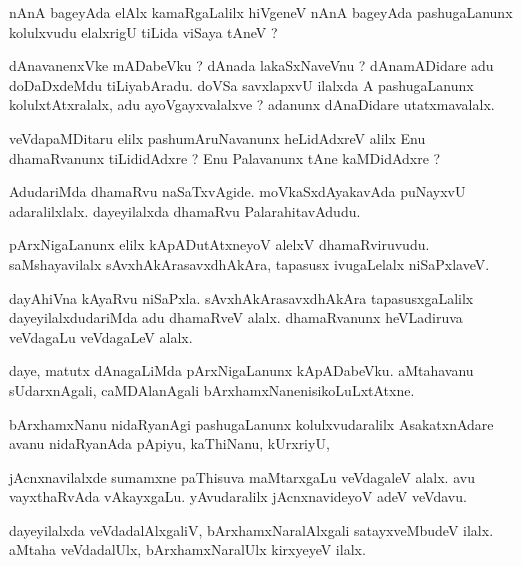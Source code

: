 \documentclass{article}
\begin{document}
\begin{mn}
nAnA bageyAda elAlx kamaRgaLalilx hiVgeneV nAnA bageyAda pashugaLanunx kolulxvudu elalxrigU tiLida viSaya tAneV ?
\end{mn}

\begin{mn}
dAnavanenxVke mADabeVku ? dAnada lakaSxNaveVnu ?  dAnamADidare adu doDaDxdeMdu tiLiyabAradu.  
doVSa savxlapxvU ilalxda A pashugaLanunx kolulxtAtxralalx, adu ayoVgayxvalalxve ?  adanunx dAnaDidare utatxmavalalx.
\end{mn}

\begin{mn}
veVdapaMDitaru elilx pashumAruNavanunx  heLidAdxreV  alilx Enu dhamaRvanunx  
tiLididAdxre ?  Enu Palavanunx tAne kaMDidAdxre ?
\end{mn}

\begin{mn}
AdudariMda dhamaRvu naSaTxvAgide. moVkaSxdAyakavAda puNayxvU adaralilxlalx.  
dayeyilalxda dhamaRvu PalarahitavAdudu.
\end{mn}

\begin{mn}
pArxNigaLanunx elilx kApADutAtxneyoV alelxV dhamaRviruvudu. saMshayavilalx  
sAvxhAkArasavxdhAkAra, tapasusx ivugaLelalx niSaPxlaveV.
\end{mn}

\begin{mn}
dayAhiVna kAyaRvu  niSaPxla.  sAvxhAkArasavxdhAkAra tapasusxgaLalilx dayeyilalxdudariMda 
adu dhamaRveV alalx.  dhamaRvanunx heVLadiruva veVdagaLu veVdagaLeV alalx.
\end{mn}

\begin{mn}
daye, matutx dAnagaLiMda pArxNigaLanunx kApADabeVku.  aMtahavanu sUdarxnAgali, 
caMDAlanAgali bArxhamxNanenisikoLuLxtAtxne.
\end{mn}

\begin{mn}
bArxhamxNanu nidaRyanAgi pashugaLanunx kolulxvudaralilx AsakatxnAdare avanu 
nidaRyanAda pApiyu, kaThiNanu, kUrxriyU,
\end{mn}

\begin{mn}
jAcnxnavilalxde sumamxne paThisuva maMtarxgaLu veVdagaleV alalx. avu vayxthaRvAda 
vAkayxgaLu.  yAvudaralilx jAcnxnavideyoV adeV veVdavu. 
\end{mn}

\begin{mn}
dayeyilalxda veVdadalAlxgaliV, bArxhamxNaralAlxgali satayxveMbudeV ilalx.  aMtaha 
veVdadalUlx, bArxhamxNaralUlx kirxyeyeV ilalx.
\end{mn}
\end{document}
